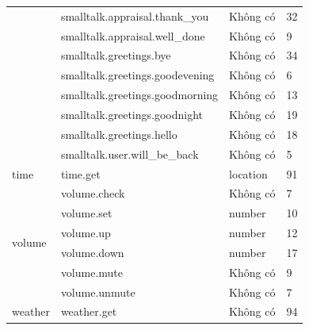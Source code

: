 \begin{itemize}
\begin{longtable}{ |l|l|l|l| }
& smalltalk.appraisal.thank\_you & Không có & 32 \\ \cline{2-4}
& smalltalk.appraisal.well\_done & Không có & 9 \\ \cline{2-4}
& smalltalk.greetings.bye & Không có & 34 \\ \cline{2-4}
& smalltalk.greetings.goodevening & Không có & 6 \\ \cline{2-4}
& smalltalk.greetings.goodmorning & Không có & 13 \\ \cline{2-4}
& smalltalk.greetings.goodnight & Không có & 19 \\ \cline{2-4}
& smalltalk.greetings.hello & Không có & 18 \\ \cline{2-4}
& smalltalk.user.will\_be\_back & Không có & 5 \\ \hline
time & time.get & location & 91 \\ \hline
\multirow{6}{*}{volume} & volume.check & Không có & 7 \\ \cline{2-4}
& volume.set & number & 10 \\ \cline{2-4}
& volume.up & number & 12 \\ \cline{2-4}
& volume.down & number & 17 \\ \cline{2-4}
& volume.mute & Không có & 9 \\ \cline{2-4}
& volume.unmute & Không có & 7 \\ \hline
weather & weather.get & Không có & 94 \\ \hline
\end{longtable}
\end{itemize}

